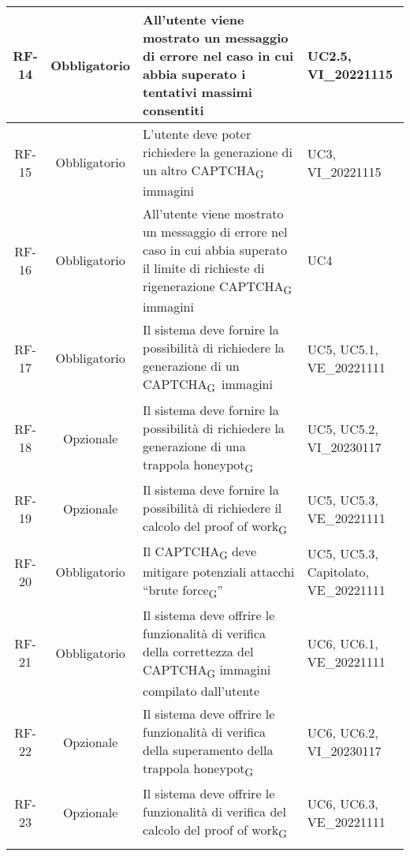 \begin{tabularx}{\textwidth}{| c | c | X | X |}
   \hline
 RF-14 & Obbligatorio & All'utente viene mostrato un messaggio di errore nel caso in cui abbia superato i tentativi massimi consentiti &  UC2.5, VI\_20221115\\
 \hline
 RF-15 & Obbligatorio & L'utente deve poter richiedere la generazione di un altro CAPTCHA\textsubscript{G} immagini &  UC3, VI\_20221115\\
 \hline
 RF-16 & Obbligatorio & All'utente viene mostrato un messaggio di errore nel caso in cui abbia superato il limite di richieste di rigenerazione CAPTCHA\textsubscript{G} immagini &  UC4\\
 \hline
 RF-17 & Obbligatorio & Il sistema deve fornire la possibilità di richiedere la generazione di un CAPTCHA\textsubscript{G}\ immagini & UC5, UC5.1, VE\_20221111\\
 \hline
 RF-18 & Opzionale & Il sistema deve fornire la possibilità di richiedere la generazione di una trappola honeypot\textsubscript{G} & UC5, UC5.2, VI\_20230117\\
  \hline
 RF-19 & Opzionale & Il sistema deve fornire la possibilità di richiedere il calcolo del proof of work\textsubscript{G} & UC5, UC5.3, VE\_20221111\\
 \hline
 RF-20 & Obbligatorio & Il CAPTCHA\textsubscript{G} deve mitigare potenziali attacchi “brute force\textsubscript{G}” & UC5, UC5.3, Capitolato, VE\_20221111\\
 \hline
 RF-21 & Obbligatorio & Il sistema deve offrire le funzionalità di verifica della correttezza del CAPTCHA\textsubscript{G} immagini compilato dall'utente & UC6, UC6.1, VE\_20221111\\
 \hline
 RF-22 & Opzionale & Il sistema deve offrire le funzionalità di verifica della superamento della trappola honeypot\textsubscript{G} & UC6, UC6.2, VI\_20230117\\
 \hline
 RF-23 & Opzionale & Il sistema deve offrire le funzionalità di verifica del calcolo del proof of work\textsubscript{G} & UC6, UC6.3, VE\_20221111\\
 \hline
 \rowcolor{white}
 \caption{Requisiti\textsubscript{G} funzionali}
\end{tabularx}

